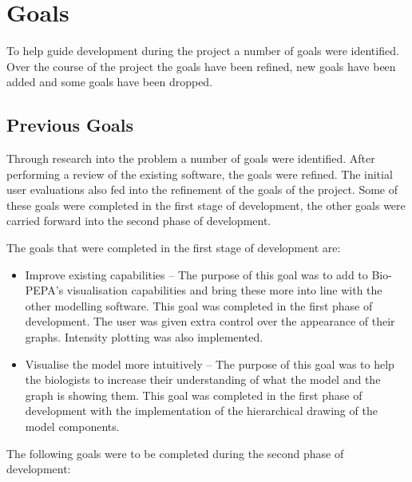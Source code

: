 \chapter{Goals}
\label{chap:goals}

To help guide development during the project a number of goals were identified.  Over the course of the project the goals have been refined, new goals have been added and some goals have been dropped.

\section{Previous Goals}
Through research into the problem a number of goals were identified.  After performing a review of the existing software, the goals were refined.  The initial user evaluations also fed into the refinement of the goals of the project.  Some of these goals were completed in the first stage of development, the other goals were carried forward into the second phase of development.

The goals that were completed in the first stage of development are:

\begin{itemize}
\item Improve existing capabilities -- The purpose of this goal was to add to Bio-PEPA's visualisation capabilities and bring these more into line with the other modelling software.  This goal was completed in the first phase of development. The user was given extra control over the appearance of their graphs.  Intensity plotting was also implemented.
\item Visualise the model more intuitively -- The purpose of this goal was to help the biologists to increase their understanding of what the model and the graph is showing them.  This goal was completed in the first phase of development with the implementation of the hierarchical drawing of the model components.
\end{itemize}

The following goals were to be completed during the second phase of development:


